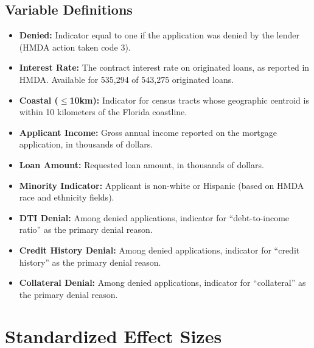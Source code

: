 \documentclass[12pt]{article}
\begin{document}
\subsection{Variable Definitions}

\begin{itemize}
\item \textbf{Denied:} Indicator equal to one if the application was denied by the lender (HMDA action taken code 3).
\item \textbf{Interest Rate:} The contract interest rate on originated loans, as reported in HMDA. Available for 535,294 of 543,275 originated loans.
\item \textbf{Coastal ($\leq$10km):} Indicator for census tracts whose geographic centroid is within 10 kilometers of the Florida coastline.
\item \textbf{Applicant Income:} Gross annual income reported on the mortgage application, in thousands of dollars.
\item \textbf{Loan Amount:} Requested loan amount, in thousands of dollars.
\item \textbf{Minority Indicator:} Applicant is non-white or Hispanic (based on HMDA race and ethnicity fields).
\item \textbf{DTI Denial:} Among denied applications, indicator for ``debt-to-income ratio'' as the primary denial reason.
\item \textbf{Credit History Denial:} Among denied applications, indicator for ``credit history'' as the primary denial reason.
\item \textbf{Collateral Denial:} Among denied applications, indicator for ``collateral'' as the primary denial reason.
\end{itemize}


\section{Standardized Effect Sizes}
\label{sec:sde}


\end{document}
